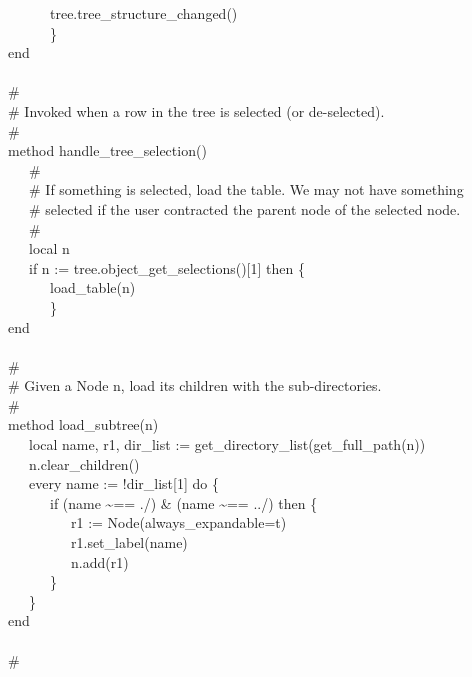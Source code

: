 {\>   \ \ \ \ \ \ tree.tree\_structure\_changed() \\
\>   \ \ \ \ \ \ \} \\
\>   end \\
\ \\
\>   \# \\
\>   \# Invoked when a row in the tree is selected (or de-selected). \\
\>   \# \\
\>   method handle\_tree\_selection() \\
\>   \ \ \ \# \\
\>   \ \ \ \# If something is selected, load the table. We may not have something\\
\>   \ \ \ \# selected if the user contracted the parent node of the selected node. \\
\>   \ \ \ \# \\
\>   \ \ \ local n \\
\>   \ \ \ if n := tree.object\_get\_selections()[1] then \{ \\
\>   \ \ \ \ \ \ load\_table(n) \\
\>   \ \ \ \ \ \ \} \\
\>   end \\
\ \\
\>   \# \\
\>   \# Given a Node n, load its children with the sub-directories. \\
\>   \# \\
\>   method load\_subtree(n) \\
\>   \ \ \ local name, r1, dir\_list := get\_directory\_list(get\_full\_path(n)) \\
\>   \ \ \ n.clear\_children() \\
\>   \ \ \ every name := !dir\_list[1] do \{ \\
\>   \ \ \ \ \ \ if (name \~{}== {\textquotedbl}./{\textquotedbl}) \&
(name \~{}== {\textquotedbl}../{\textquotedbl}) then \{ \\
\>   \ \ \ \ \ \ \ \ \ r1 :=
Node({\textquotedbl}always\_expandable=t{\textquotedbl}) \\
\>   \ \ \ \ \ \ \ \ \ r1.set\_label(name) \\
\>   \ \ \ \ \ \ \ \ \ n.add(r1) \\
\>   \ \ \ \ \ \ \} \\
\>   \ \ \ \} \\
\>   end \\
\ \\
\>   \# \\
}
